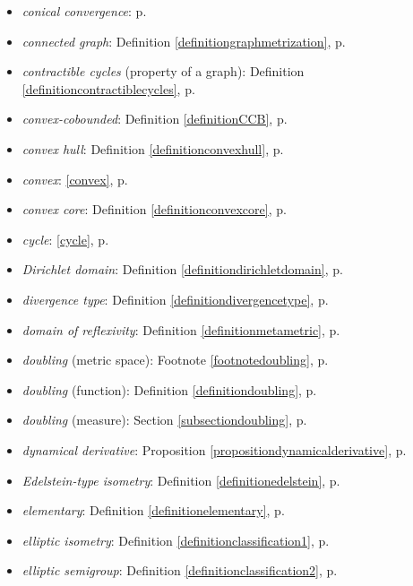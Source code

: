 \begin{itemize}
\item\emph{conical convergence}: p.\pageref{subsectionmodes}
\item\emph{connected graph}: Definition \ref{definitiongraphmetrization}, p.\pageref{definitiongraphmetrization}
\item\emph{contractible cycles} (property of a graph): Definition \ref{definitioncontractiblecycles}, p.\pageref{definitioncontractiblecycles}
\item\emph{convex-cobounded}: Definition \ref{definitionCCB}, p.\pageref{definitionCCB}
\item\emph{convex hull}: Definition \ref{definitionconvexhull}, p.\pageref{definitionconvexhull}
\item\emph{convex}: \eqref{convex}, p.\pageref{convex}
\item\emph{convex core}: Definition \ref{definitionconvexcore}, p.\pageref{definitionconvexcore}
\item\emph{cycle}: \eqref{cycle}, p.\pageref{cycle}
\item\emph{Dirichlet domain}: Definition \ref{definitiondirichletdomain}, p.\pageref{definitiondirichletdomain}
\item\emph{divergence type}: Definition \ref{definitiondivergencetype}, p.\pageref{definitiondivergencetype}
\item\emph{domain of reflexivity}: Definition \ref{definitionmetametric}, p.\pageref{definitionmetametric}
\item\emph{doubling} (metric space): Footnote \ref{footnotedoubling}, p.\pageref{footnotedoubling}
\item\emph{doubling} (function): Definition \ref{definitiondoubling}, p.\pageref{definitiondoubling}
\item\emph{doubling} (measure): Section \ref{subsectiondoubling}, p.\pageref{subsectiondoubling}
\item\emph{dynamical derivative}: Proposition \ref{propositiondynamicalderivative}, p.\pageref{propositiondynamicalderivative}
\item\emph{Edelstein-type isometry}: Definition \ref{definitionedelstein}, p.\pageref{definitionedelstein}
\item\emph{elementary}: Definition \ref{definitionelementary}, p.\pageref{definitionelementary}
\item\emph{elliptic isometry}: Definition \ref{definitionclassification1}, p.\pageref{definitionclassification1}
\item\emph{elliptic semigroup}: Definition \ref{definitionclassification2}, p.\pageref{definitionclassification2}

\end{itemize}
